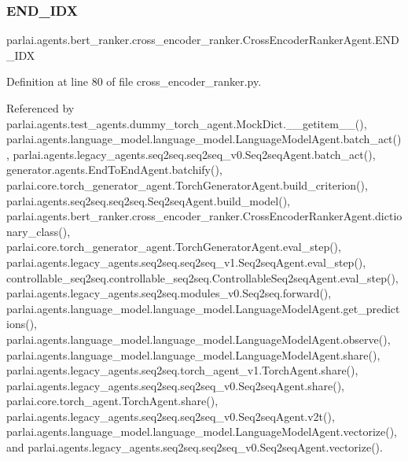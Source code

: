 \subsubsection{\texorpdfstring{E\+N\+D\+\_\+\+I\+DX}{END\_IDX}}
{\footnotesize\ttfamily parlai.\+agents.\+bert\+\_\+ranker.\+cross\+\_\+encoder\+\_\+ranker.\+Cross\+Encoder\+Ranker\+Agent.\+E\+N\+D\+\_\+\+I\+DX}



Definition at line 80 of file cross\+\_\+encoder\+\_\+ranker.\+py.



Referenced by parlai.\+agents.\+test\+\_\+agents.\+dummy\+\_\+torch\+\_\+agent.\+Mock\+Dict.\+\_\+\+\_\+getitem\+\_\+\+\_\+(), parlai.\+agents.\+language\+\_\+model.\+language\+\_\+model.\+Language\+Model\+Agent.\+batch\+\_\+act(), parlai.\+agents.\+legacy\+\_\+agents.\+seq2seq.\+seq2seq\+\_\+v0.\+Seq2seq\+Agent.\+batch\+\_\+act(), generator.\+agents.\+End\+To\+End\+Agent.\+batchify(), parlai.\+core.\+torch\+\_\+generator\+\_\+agent.\+Torch\+Generator\+Agent.\+build\+\_\+criterion(), parlai.\+agents.\+seq2seq.\+seq2seq.\+Seq2seq\+Agent.\+build\+\_\+model(), parlai.\+agents.\+bert\+\_\+ranker.\+cross\+\_\+encoder\+\_\+ranker.\+Cross\+Encoder\+Ranker\+Agent.\+dictionary\+\_\+class(), parlai.\+core.\+torch\+\_\+generator\+\_\+agent.\+Torch\+Generator\+Agent.\+eval\+\_\+step(), parlai.\+agents.\+legacy\+\_\+agents.\+seq2seq.\+seq2seq\+\_\+v1.\+Seq2seq\+Agent.\+eval\+\_\+step(), controllable\+\_\+seq2seq.\+controllable\+\_\+seq2seq.\+Controllable\+Seq2seq\+Agent.\+eval\+\_\+step(), parlai.\+agents.\+legacy\+\_\+agents.\+seq2seq.\+modules\+\_\+v0.\+Seq2seq.\+forward(), parlai.\+agents.\+language\+\_\+model.\+language\+\_\+model.\+Language\+Model\+Agent.\+get\+\_\+predictions(), parlai.\+agents.\+language\+\_\+model.\+language\+\_\+model.\+Language\+Model\+Agent.\+observe(), parlai.\+agents.\+language\+\_\+model.\+language\+\_\+model.\+Language\+Model\+Agent.\+share(), parlai.\+agents.\+legacy\+\_\+agents.\+seq2seq.\+torch\+\_\+agent\+\_\+v1.\+Torch\+Agent.\+share(), parlai.\+agents.\+legacy\+\_\+agents.\+seq2seq.\+seq2seq\+\_\+v0.\+Seq2seq\+Agent.\+share(), parlai.\+core.\+torch\+\_\+agent.\+Torch\+Agent.\+share(), parlai.\+agents.\+legacy\+\_\+agents.\+seq2seq.\+seq2seq\+\_\+v0.\+Seq2seq\+Agent.\+v2t(), parlai.\+agents.\+language\+\_\+model.\+language\+\_\+model.\+Language\+Model\+Agent.\+vectorize(), and parlai.\+agents.\+legacy\+\_\+agents.\+seq2seq.\+seq2seq\+\_\+v0.\+Seq2seq\+Agent.\+vectorize().

\mbox{\label{classparlai_1_1agents_1_1bert__ranker_1_1cross__encoder__ranker_1_1CrossEncoderRankerAgent_aa61dee97328ecd3c43cc8f1d6d472c6f}} 

